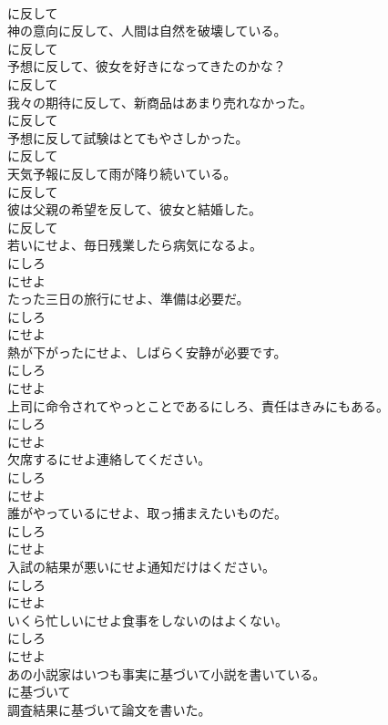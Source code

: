 \documentclass[8pt]{extreport}
\begin{document}
\begin{CJK}{UTF8}{min}
\\	に反して
\\	神の意向に反して、人間は自然を破壊している。	
\\	に反して
\\	予想に反して、彼女を好きになってきたのかな？	
\\	に反して
\\	我々の期待に反して、新商品はあまり売れなかった。	
\\	に反して
\\	予想に反して試験はとてもやさしかった。	
\\	に反して
\\	天気予報に反して雨が降り続いている。	
\\	に反して
\\	彼は父親の希望を反して、彼女と結婚した。	
\\	に反して
\\	若いにせよ、毎日残業したら病気になるよ。	
\\	にしろ 
\\	にせよ
\\	たった三日の旅行にせよ、準備は必要だ。	
\\	にしろ 
\\	にせよ
\\	熱が下がったにせよ、しばらく安静が必要です。	
\\	にしろ 
\\	にせよ
\\	上司に命令されてやっとことであるにしろ、責任はきみにもある。	
\\	にしろ 
\\	にせよ
\\	欠席するにせよ連絡してください。	
\\	にしろ 
\\	にせよ
\\	誰がやっているにせよ、取っ捕まえたいものだ。	
\\	にしろ 
\\	にせよ
\\	入試の結果が悪いにせよ通知だけはください。	
\\	にしろ 
\\	にせよ
\\	いくら忙しいにせよ食事をしないのはよくない。	
\\	にしろ 
\\	にせよ
\\	あの小説家はいつも事実に基づいて小説を書いている。	
\\	に基づいて
\\	調査結果に基づいて論文を書いた。	

\end{CJK}
\end{document}
